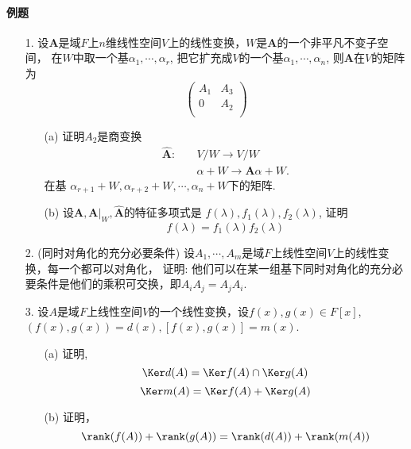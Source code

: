 \paragraph{例题}
\begin{itemize}
    \item [1.] 设$\mathbf{A}$是域$F$上$n$维线性空间$V$上的线性变换，$W$是$\mathbf{A}$的一个非平凡不变子空间，
    在$W$中取一个基$\alpha_1, \cdots, \alpha_r$, 
    把它扩充成$V$的一个基$\alpha_1, \cdots, \alpha_n$,
    则$\mathbf{A}$在$V$的矩阵为
    \begin{equation}
    \nonumber
    \begin{pmatrix}
        A_1& A_3\\
        0  & A_2\\
    \end{pmatrix}
    \end{equation}
    \begin{itemize}
        \item [(a) ] 证明$A_2$是商变换
        \begin{equation}
        \nonumber
        \begin{aligned}
        \mathbf{\hat A}: \quad &V/W \longrightarrow V/W\\
                         &\alpha + W \longrightarrow \mathbf{A}\alpha + W.
        \end{aligned}
        \end{equation}
        在基
        $\alpha_{r+1} + W, \alpha_{r+2}+W, \cdots, \alpha_n+W$下的矩阵.
        \vspace{2cm}
        \item [(b) ] 设$\mathbf{A}, \mathbf{A}|_W, \mathbf{\hat A}$的特征多项式是
        $f(\lambda),f_1(\lambda), f_2(\lambda)$, 证明
        $$f(\lambda) = f_1(\lambda)f_2(\lambda)$$
        \vspace{2cm}
    \end{itemize}

    \item [2.] (同时对角化的充分必要条件) 设$A_1, \cdots, A_m$是域$F$上线性空间$V$上的线性变换，每一个都可以对角化，
    证明: 他们可以在某一组基下同时对角化的充分必要条件是他们的乘积可交换，即$A_i A_j = A_j A_i$.
    \vspace{4cm}

    \item [3.] 设$A$是域$F$上线性空间$V$的一个线性变换，设$f(x),g(x) \in F[x]$,
    $(f(x),g(x))=d(x), \left[f(x),g(x)\right]=m(x)$.
    \begin{itemize}
        \item [(a) ] 证明,
        $$\Ker d(A) = \Ker f(A) \cap \Ker g(A)$$
        $$\Ker m(A) = \Ker f(A) + \Ker g(A)$$
        \item [(b) ] 证明，
        $$\rank(f(A)) +\rank(g(A)) = \rank(d(A)) + \rank(m(A))$$
    \end{itemize}
    \vspace{3cm}
\end{itemize}


